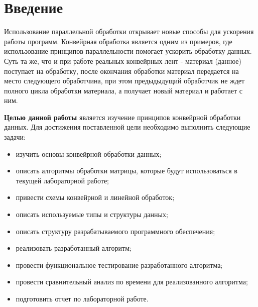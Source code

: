 \chapter*{Введение}

Использование параллельной обработки открывает новые способы для ускорения работы программ. Конвейрная обработка является одним из примеров, где использование принципов параллельности помогает ускорить обработку данных. Суть та же, что и при работе реальных конвейрных лент - материал (данное) поступает на обработку, после окончания обработки материал передается на место следующего обработчина, при этом предыдыдущий обработчик не ждет полного цикла обработки материала, а получает новый материал и работает с ним.


\textbf{Целью данной работы} является изучение принципов конвейрной обработки данных. 
Для достижения поставленной цели необходимо выполнить следующие задачи:
\begin{itemize}
	\item изучить основы конвейрной обработки данных;
    \item описать алгоритмы обработки матрицы, которые будут использоваться в текущей лабораторной работе;
    \item привести схемы конвейрной и линейной обработок;
    \item описать используемые типы и структуры данных;
    \item описать структуру разрабатываемого программного обеспечения;
    \item реализовать разработанный алгоритм;
    \item провести функциональное тестирование разработанного алгоритма;
    \item провести сравнительный анализ по времени для реализованного алгоритма;
    \item подготовить отчет по лабораторной работе.
\end{itemize}
